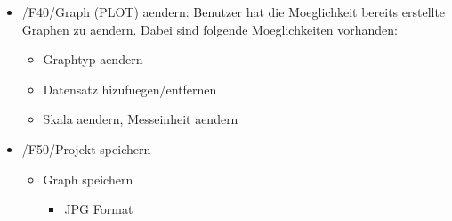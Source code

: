\begin{itemize}
\item /F40/Graph (PLOT) aendern: Benutzer hat die Moeglichkeit bereits erstellte Graphen zu aendern. Dabei sind folgende Moeglichkeiten vorhanden:
	\begin{itemize}
		\item Graphtyp aendern\\
		\item Datensatz hizufuegen/entfernen\\
		\item Skala aendern, Messeinheit aendern\\
	\end{itemize}

\item /F50/Projekt speichern\\
	\begin{itemize}
			
		\item Graph speichern\\
			\begin{itemize}
					\item JPG Format\\
			\end{itemize}		
	\end{itemize}
\end{itemize}
